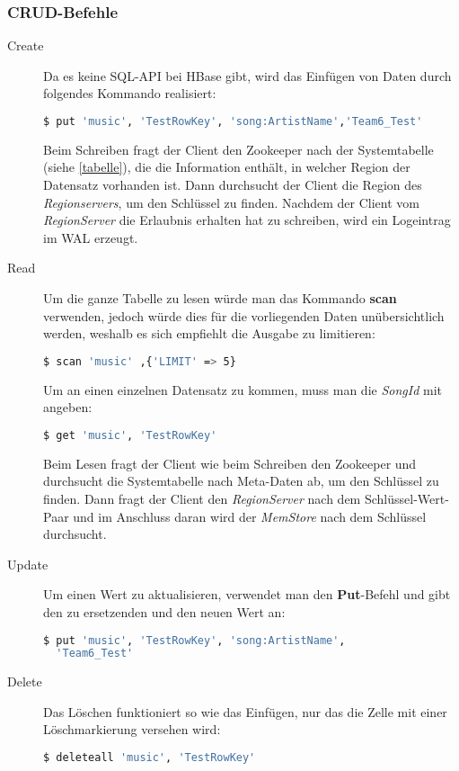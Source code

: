\subsubsection{CRUD-Befehle}
\begin{description}
\item[Create] Da es keine SQL-API bei HBase gibt, wird das Einfügen von Daten durch folgendes Kommando realisiert:
\begin{lstlisting}[language=bash]
  $ put 'music', 'TestRowKey', 'song:ArtistName','Team6_Test'
\end{lstlisting}
Beim Schreiben fragt der Client den Zookeeper nach der Systemtabelle (siehe \ref{tabelle}), die die Information enthält, in welcher Region der Datensatz vorhanden ist. Dann durchsucht der Client die Region des \textit{Regionservers}, um den Schlüssel zu finden.
Nachdem der Client vom \textit{RegionServer} die Erlaubnis erhalten hat zu schreiben, wird ein Logeintrag im \ac{WAL} erzeugt.
\item[Read] Um die ganze Tabelle zu lesen würde man das Kommando \textbf{scan} verwenden, jedoch würde dies für die vorliegenden Daten unübersichtlich werden, weshalb es sich empfiehlt die Ausgabe zu limitieren:
\begin{lstlisting}[language=bash]
  $ scan 'music' ,{'LIMIT' => 5}
\end{lstlisting}
Um an einen einzelnen Datensatz zu kommen, muss man die \textit{SongId} mit angeben:
\begin{lstlisting}[language=bash]
  $ get 'music', 'TestRowKey'
\end{lstlisting}
Beim Lesen fragt der Client wie beim Schreiben den Zookeeper und durchsucht die Systemtabelle nach Meta-Daten ab, um den Schlüssel zu finden. Dann fragt der Client den \textit{RegionServer} nach dem Schlüssel-Wert-Paar und im Anschluss daran wird der \textit{MemStore}
nach dem Schlüssel durchsucht.
\item[Update] Um einen Wert zu aktualisieren, verwendet man den \textbf{Put}-Befehl und gibt den zu ersetzenden und den neuen Wert an:
\begin{lstlisting}[language=bash]
  $ put 'music', 'TestRowKey', 'song:ArtistName',
  'Team6_Test'
\end{lstlisting}
\item[Delete] Das Löschen funktioniert so wie das Einfügen, nur das die Zelle mit einer Löschmarkierung versehen wird: 
\begin{lstlisting}[language=bash]
  $ deleteall 'music', 'TestRowKey'
\end{lstlisting}
\end{description}


